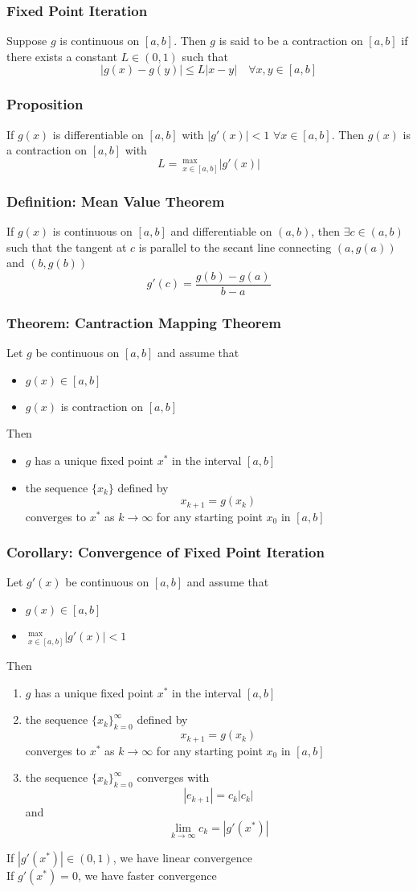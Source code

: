 \documentclass[11pt]{article}
\newcommand{\ds}{\displaystyle}
\begin{document}
\subsubsection{Fixed Point Iteration}
Suppose $g$ is continuous on $[a,b]$. Then $g$ is said to be a contraction on $[a,b]$ if there exists a constant $L\in(0,1)$ such that \[|g(x)-g(y)|\leq L|x-y|\quad \forall x,y\in[a,b]\]
\subsubsection*{Proposition}
If $g(x)$ is differentiable on $[a,b]$ with $|g'(x)|<1$ $\forall x\in[a,b]$. Then $g(x)$ is a contraction on $[a,b]$ with \[L=\ ^{\text{max}}_{x\in[a,b]}|g'(x)|\]
\subsubsection*{Definition: Mean Value Theorem}
If $g(x)$ is continuous on $[a,b]$ and differentiable on $(a,b)$, then $\exists c\in(a,b)$ such that the tangent at $c$ is parallel to the secant line connecting $(a,g(a))$ and $(b,g(b))$
\[g'(c) = \frac{g(b)-g(a)}{b-a}\]
\subsubsection*{Theorem: Cantraction Mapping Theorem}
Let $g$ be continuous on $[a,b]$ and assume that 
\begin{itemize}
  \item $g(x)\in[a,b]$
  \item $g(x)$ is contraction on $[a,b]$
\end{itemize}
Then 
\begin{itemize}
  \item $g$ has a unique fixed point $x^*$ in the interval $[a,b]$
  \item the sequence $\{x_k\}$ defined by \[x_{k+1}=g(x_k)\] converges to $x^*$ as $k\rightarrow\infty$ for any starting point $x_0$ in $[a,b]$
\end{itemize}
\subsubsection*{Corollary: Convergence of Fixed Point Iteration}
Let $g'(x)$ be continuous on $[a,b]$ and assume that 
\begin{itemize}
  \item $g(x)\in[a,b]$
  \item $\ ^{\text{max}}_{x\in[a,b]}|g'(x)|<1$
\end{itemize}
Then 
\begin{enumerate}
  \item $g$ has a unique fixed point $x^*$ in the interval $[a,b]$
  \item the sequence $\{x_k\}^\infty_{k=0}$ defined by \[x_{k+1}=g(x_k)\] converges to $x^*$ as $k\rightarrow\infty$ for any starting point $x_0$ in $[a,b]$
  \item the sequence $\{x_k\}^\infty_{k=0}$ converges with \[|e_{k+1}| = c_k|c_k|\] and \[\ds\lim_{k\rightarrow\infty}c_k = |g'(x^*)|\]
\end{enumerate}
If $|g'(x^*)|\in(0,1)$, we have linear convergence \\
If $g'(x^*)=0$, we have faster convergence 
\end{document}
